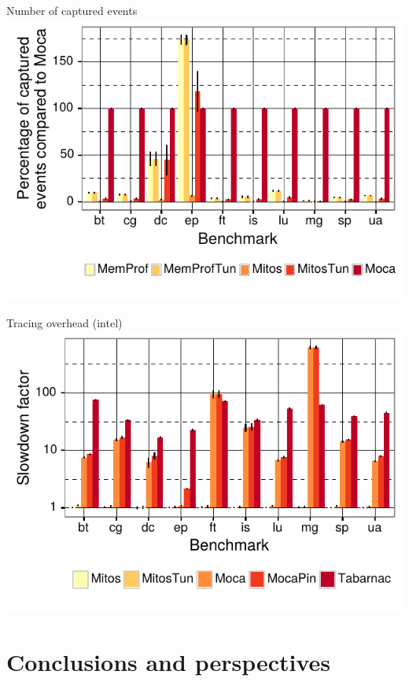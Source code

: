 \documentclass[xcolor={usenames,dvipsnames},hyperref={pdfusetitle}]{beamer}
\begin{document}
\begin{frame}{Number of captured events}
        \includegraphics[width=\linewidth]{moca/moca_addr_intel.pdf}
\end{frame}

\begin{frame}{Tracing overhead (intel)}
        \includegraphics[width=\linewidth]{moca/moca_overhead_intel.pdf}
\end{frame}

\section{Conclusions and perspectives}
\end{document}
